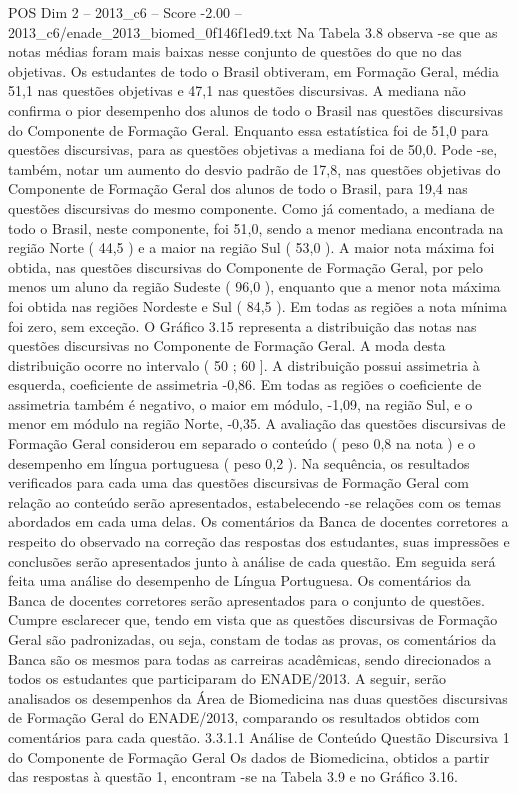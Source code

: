 \begin{textsample}{POS Dim 2 – 2013\_c6 – Score -2.00 – 2013\_c6/enade\_2013\_biomed\_0f146f1ed9.txt}
Na Tabela 3.8 observa -se que as notas médias foram mais baixas nesse conjunto de questões do que no das objetivas.
Os estudantes de todo o Brasil obtiveram, em Formação Geral, média 51,1 nas questões objetivas e 47,1 nas questões discursivas.
A mediana não confirma o pior desempenho dos alunos de todo o Brasil nas questões discursivas do Componente de Formação Geral.
Enquanto essa estatística foi de 51,0 para questões discursivas, para as questões objetivas a mediana foi de 50,0.
Pode -se, também, notar um aumento do desvio padrão de 17,8, nas questões objetivas do Componente de Formação Geral dos alunos de todo o Brasil, para 19,4 nas questões discursivas do mesmo componente.
Como já comentado, a mediana de todo o Brasil, neste componente, foi 51,0, sendo a menor mediana encontrada na região Norte ( 44,5 ) e a maior na região Sul ( 53,0 ).
A maior nota máxima foi obtida, nas questões discursivas do Componente de Formação Geral, por pelo menos um aluno da região Sudeste ( 96,0 ), enquanto que a menor nota máxima foi obtida nas regiões Nordeste e Sul ( 84,5 ).
Em todas as regiões a nota mínima foi zero, sem exceção.
O Gráfico 3.15 representa a distribuição das notas nas questões discursivas no Componente de Formação Geral.
A moda desta distribuição ocorre no intervalo ( 50 ; 60 ].
A distribuição possui assimetria à esquerda, coeficiente de assimetria -0,86.
Em todas as regiões o coeficiente de assimetria também é negativo, o maior em módulo, -1,09, na região Sul, e o menor em módulo na região Norte, -0,35.
A avaliação das questões discursivas de Formação Geral considerou em separado o conteúdo ( peso 0,8 na nota ) e o desempenho em língua portuguesa ( peso 0,2 ).
Na sequência, os resultados verificados para cada uma das questões discursivas de Formação Geral com relação ao conteúdo serão apresentados, estabelecendo -se relações com os temas abordados em cada uma delas.
Os comentários da Banca de docentes corretores a respeito do observado na correção das respostas dos estudantes, suas impressões e conclusões serão apresentados junto à análise de cada questão.
Em seguida será feita uma análise do desempenho de Língua Portuguesa.
Os comentários da Banca de docentes corretores serão apresentados para o conjunto de questões.
Cumpre esclarecer que, tendo em vista que as questões discursivas de Formação Geral são padronizadas, ou seja, constam de todas as provas, os comentários da Banca são os mesmos para todas as carreiras acadêmicas, sendo direcionados a todos os estudantes que participaram do ENADE/2013.
A seguir, serão analisados os desempenhos da Área de Biomedicina nas duas questões discursivas de Formação Geral do ENADE/2013, comparando os resultados obtidos com comentários para cada questão. 3.3.1.1 Análise de Conteúdo Questão Discursiva 1 do Componente de Formação Geral Os dados de Biomedicina, obtidos a partir das respostas à questão 1, encontram -se na Tabela 3.9 e no Gráfico 3.16.

\end{textsample}
